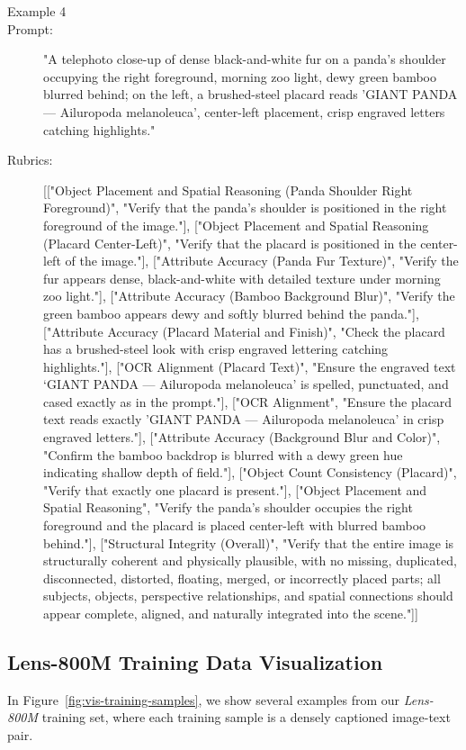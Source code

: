 \documentclass{llmxive}
\begin{document}
\begin{tcolorbox}
\begin{description}
\item[Example 4]
\item[Prompt:] "A telephoto close-up of dense black-and-white fur on a panda's shoulder occupying the right foreground, morning zoo light, dewy green bamboo blurred behind; on the left, a brushed-steel placard reads 'GIANT PANDA — Ailuropoda melanoleuca', center-left placement, crisp engraved letters catching highlights."
\item[Rubrics:] [["Object Placement and Spatial Reasoning (Panda Shoulder Right Foreground)", "Verify that the panda’s shoulder is positioned in the right foreground of the image."], ["Object Placement and Spatial Reasoning (Placard Center-Left)", "Verify that the placard is positioned in the center-left of the image."], ["Attribute Accuracy (Panda Fur Texture)", "Verify the fur appears dense, black-and-white with detailed texture under morning zoo light."], ["Attribute Accuracy (Bamboo Background Blur)", "Verify the green bamboo appears dewy and softly blurred behind the panda."], ["Attribute Accuracy (Placard Material and Finish)", "Check the placard has a brushed-steel look with crisp engraved lettering catching highlights."], ["OCR Alignment (Placard Text)", "Ensure the engraved text ‘GIANT PANDA — Ailuropoda melanoleuca’ is spelled, punctuated, and cased exactly as in the prompt."], ["OCR Alignment", "Ensure the placard text reads exactly 'GIANT PANDA — Ailuropoda melanoleuca' in crisp engraved letters."], ["Attribute Accuracy (Background Blur and Color)", "Confirm the bamboo backdrop is blurred with a dewy green hue indicating shallow depth of field."], ["Object Count Consistency (Placard)", "Verify that exactly one placard is present."], ["Object Placement and Spatial Reasoning", "Verify the panda's shoulder occupies the right foreground and the placard is placed center-left with blurred bamboo behind."], ["Structural Integrity (Overall)", "Verify that the entire image is structurally coherent and physically plausible, with no missing, duplicated, disconnected, distorted, floating, merged, or incorrectly placed parts; all subjects, objects, perspective relationships, and spatial connections should appear complete, aligned, and naturally integrated into the scene."]]


\end{description}
\end{tcolorbox}


\subsection{Lens-800M Training Data Visualization}
\label{sec:lens-800M visualization}
In Figure~\ref{fig:vis-training-samples}, we show several examples from our \textit{Lens-800M} training set, where each training sample is a densely captioned image-text pair.
\end{document}
